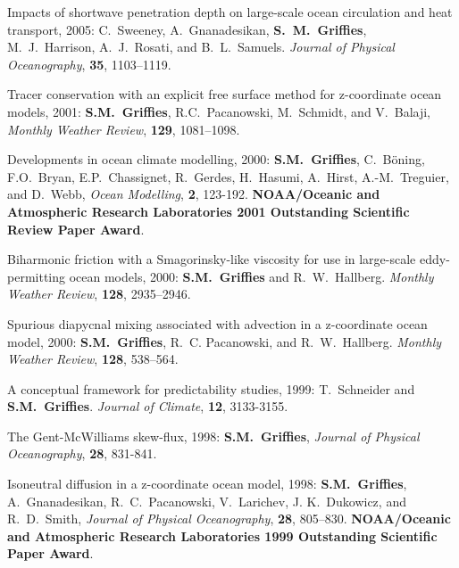 \begin{etaremune}
\item Impacts of shortwave penetration depth on large-scale ocean
circulation and heat transport, 2005: C.\ Sweeney, A.\ Gnanadesikan,
{\bf S.\ M.\ Grif\/f\/ies}, M.\ J.\ Harrison, A.\ J.\ Rosati, and B.\
L.\ Samuels.  {\em Journal of Physical Oceanography}, {\bf 35},
1103--1119.

\item Tracer conservation with an explicit free surface method for
  z-coordinate ocean models, 2001: {\bf S.M.\ Grif\/f\/ies}, R.C.\
  Pacanowski, M.\ Schmidt, and V.\ Balaji, {\em Monthly Weather
    Review}, {\bf 129}, 1081--1098.

\item Developments in ocean climate modelling, 2000: {\bf S.M.\
    Grif\/f\/ies}, C.\ B\"oning, F.O.\ Bryan, E.P.\ Chassignet, R.\
  Gerdes, H.\ Hasumi, A.\ Hirst, A.-M.\ Treguier, and D.\ Webb, {\em
    Ocean Modelling}, {\bf 2}, 123-192.  {\bf 
    NOAA/Oceanic and Atmospheric Research Laboratories 2001
    Outstanding Scientific Review Paper Award}.

\item Biharmonic friction with a  Smagorinsky-like 
viscosity for use in large-scale eddy-permitting ocean models, 2000:
{\bf S.M.\ Grif\/f\/ies} and R.\ W.\ Hallberg.  {\em Monthly Weather
Review}, {\bf 128}, 2935--2946.

\item Spurious diapycnal mixing associated with advection in a
z-coordinate ocean model, 2000: {\bf S.M.\ Grif\/f\/ies}, R.\ C.
Pacanowski, and R.\ W.\ Hallberg. {\em Monthly Weather Review}, {\bf
128}, 538--564.

\item A conceptual framework for predictability studies, 1999: T.\ 
Schneider and {\bf S.M.\ Grif\/f\/ies}.  {\em Journal of Climate},
{\bf 12}, 3133-3155.
  
\item The Gent-McWilliams skew-flux, 1998: {\bf S.M.\ 
Grif\/f\/ies}, {\em Journal of Physical Oceanography}, {\bf 28},
831-841.
  
\item Isoneutral diffusion in a z-coordinate ocean model, 1998: {\bf
    S.M.\ Grif\/f\/ies}, A.\ Gnanadesikan, R.\ C.\ Pacanowski, V.\
  Larichev, J. K.\ Dukowicz, and R.\ D.\ Smith, {\em Journal of
    Physical Oceanography}, {\bf 28}, 805--830.  {\bf
    NOAA/Oceanic and Atmospheric Research Laboratories 1999
    Outstanding Scientific Paper Award}.
  

\end{etaremune}
